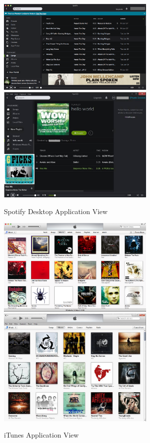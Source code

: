 \documentclass[11pt]{article}
\begin{document}
\begin{figure}[H] %
   \centering
   \includegraphics[width=3in]{spotify_mac.png}       
   \includegraphics[width=3in]{spotify_pc.jpg} 
   \caption{Spotify Desktop Application View}
   \label{fig:spotify_view}
\end{figure}

\begin{figure}[H] %
   \centering
   \includegraphics[width=3in]{iTunes_mac.png}       
   \includegraphics[width=3in]{iTunes_pc.jpg}
   \caption{iTunes Application View}
   \label{fig:iTunes_view}
\end{figure}
\end{document}
